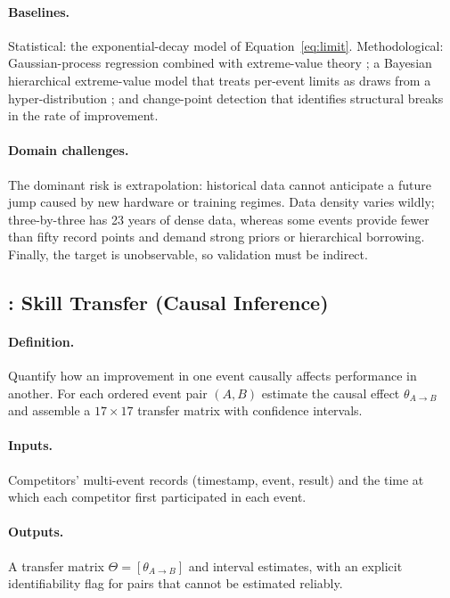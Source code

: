 \paragraph{Baselines.}
Statistical: the exponential-decay model of Equation~\ref{eq:limit}.
Methodological: Gaussian-process regression combined with extreme-value theory
\citep{evt_coles}; a Bayesian hierarchical extreme-value model
that treats per-event limits as draws from a hyper-distribution
\citep{bayesian_hierarchical}; and change-point detection that identifies
structural breaks in the rate of improvement.

\paragraph{Domain challenges.}
The dominant risk is extrapolation: historical data cannot anticipate a future
jump caused by new hardware or training regimes. Data density varies wildly;
three-by-three has 23 years of dense data, whereas some events provide fewer
than fifty record points and demand strong priors or hierarchical borrowing.
Finally, the target is unobservable, so validation must be indirect.

\subsection{: Skill Transfer (Causal Inference)}
\label{sec:task5}

\paragraph{Definition.}
Quantify how an improvement in one event causally affects performance in
another. For each ordered event pair $(A, B)$ estimate the causal effect
$\theta_{A \to B}$ and assemble a $17 \times 17$ transfer matrix with
confidence intervals.

\paragraph{Inputs.}
Competitors' multi-event records (timestamp, event, result) and the time at
which each competitor first participated in each event.

\paragraph{Outputs.}
A transfer matrix $\Theta = [\theta_{A \to B}]$ and interval estimates, with an
explicit identifiability flag for pairs that cannot be estimated reliably.

